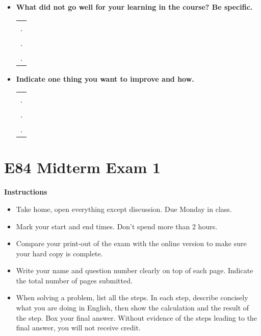 \begin{itemize}
\begin{itemize}
\item {\bf What did not go well for your learning in the course? Be specific.}
\begin{tabular}{l}
.  \\
.  \\
.  \\
\end{tabular}
\vskip 0.9in

\item {\bf Indicate one thing you want to improve and how.}
\begin{tabular}{l}
.  \\
.  \\
.  \\
\end{tabular}
\vskip 0.9in

\end{itemize}

\end{itemize}


\section*{E84 Midterm Exam 1}

{\bf Instructions}
\begin{itemize}
\item Take home, open everything except discussion. Due Monday in class.
\item Mark your start and end times. Don't spend more than 2 hours.
\item Compare your print-out of the exam with the online version to make
  sure your hard copy is complete.
\item Write your name and question number clearly on top of each page.
  Indicate the total number of pages submitted.
\item When solving a problem, list all the steps. In each step, describe 
  concisely what you are doing in English, then show the calculation 
  and the result of the step. Box your final answer. Without evidence of
  the steps leading to the final answer, you will not receive credit.
\end{itemize}

